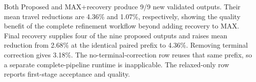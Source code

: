 Both Proposed and MAX+recovery produce 9/9 new validated outputs. Their mean travel reductions are 4.36\% and 1.07\%, respectively, showing the quality benefit of the complete refinement workflow beyond adding recovery to MAX. Final recovery supplies four of the nine proposed outputs and raises mean reduction from 2.68\% at the identical paired prefix to 4.36\%. Removing terminal correction gives 3.18\%. The no-terminal-correction row reuses that same prefix, so a separate complete-pipeline runtime is inapplicable. The relaxed-only row reports first-stage acceptance and quality.
